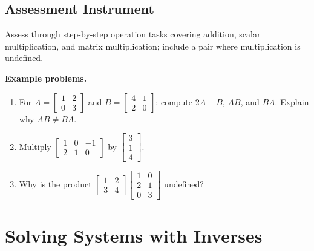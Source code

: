 \subsection{Assessment Instrument}
\label{ssec:asse-3669}


Assess through step-by-step operation tasks covering addition, scalar
multiplication, and matrix multiplication; include a pair where
multiplication is undefined.

\textbf{Example problems.}
\begin{enumerate}
    \item For $A=\begin{bmatrix}1&2\\0&3\end{bmatrix}$ and
          $B=\begin{bmatrix}4&1\\2&0\end{bmatrix}$:
          compute $2A-B$, $AB$, and $BA$. Explain why $AB\neq BA$.
    \item Multiply $\begin{bmatrix}1&0&-1\\2&1&0\end{bmatrix}$ by
          $\begin{bmatrix}3\\1\\4\end{bmatrix}$.
    \item Why is the product $\begin{bmatrix}1&2\\3&4\end{bmatrix}
          \begin{bmatrix}1&0\\2&1\\0&3\end{bmatrix}$ undefined?
\end{enumerate}



\section{Solving Systems with Inverses}
\label{sec:solv-038b}



